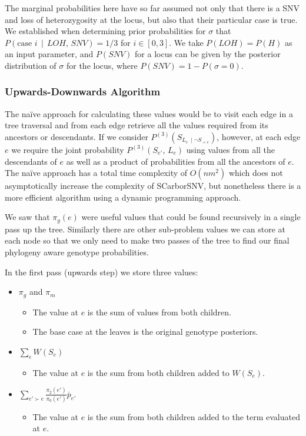 \documentclass[../../main.tex]{subfiles}
\begin{document}
The marginal probabilities here have so far assumed not only that there is a SNV and loss of heterozygosity at the locus, but also that their particular case is true.
We established when determining prior probabilities for $\sigma$ that $P(\text{case }i\,\mid\,LOH,\,SNV) = 1/3$ for $i\in[0,3]$.
We take $P(LOH) = P(H)$ as an input parameter, and $P(SNV)$ for a locus can be given by the posterior distribution of $\sigma$ for the locus, where $P(SNV) = 1-P(\sigma=0)$.

\subsubsection*{Upwards-Downwards Algorithm}
The na\"ive approach for calculating these values would be to visit each edge in a tree traversal and from each edge retrieve all the values required from its ancestors or descendants.
If we consider $P^{(3)}(S_{L_e\,\mid\neg S_{\prec e}})$, however, at each edge $e$ we require the joint probability $P^{(3)}(S_{e'},\,L_e)$ using values from all the descendants of $e$ as well as a product of probabilities from all the ancestors of $e$.
The na\"ive approach has a total time complexity of $O(nm^2)$ which does not asymptotically increase the complexity of SCarborSNV, but nonetheless there is a more efficient algorithm using a dynamic programming approach.

We saw that $\pi_g(e)$ were useful values that could be found recursively in a single pass up the tree.
Similarly there are other sub-problem values we can store at each node so that we only need to make two passes of the tree to find our final phylogeny aware genotype probabilities.

In the first pass (upwards step) we store three values:
\begin{itemize}
    \item $\pi_g$ and $\pi_m$
        \begin{itemize}
            \item The value at $e$ is the sum of values from both children.
            \item The base case at the leaves is the original genotype posteriors.
        \end{itemize}
    \item $\sum_e W(S_e)$
        \begin{itemize}
            \item The value at $e$ is the sum from both children added to $W(S_e)$.
        \end{itemize}
    \item $\sum_{e'\succ e} \frac{\pi_2(e')}{\pi_0(e')}\overline{p}_{e'}$
        \begin{itemize}
            \item The value at $e$ is the sum from both children added to the term evaluated at $e$.
        \end{itemize}
\end{itemize}
\end{document}
